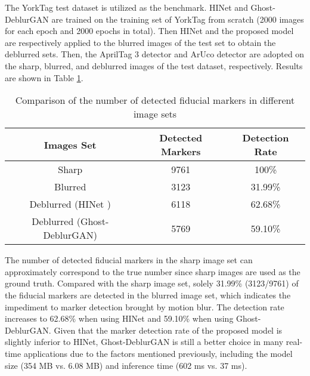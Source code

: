\documentclass[letterpaper, 10 pt, conference]{ieeeconf}
\begin{document}
The YorkTag test dataset is utilized as the benchmark. HINet and Ghost-DeblurGAN are trained on the training set of YorkTag from scratch (2000 images for each epoch and 2000 epochs in total). Then HINet and the proposed model are respectively applied to the blurred images of the test set to obtain the deblurred sets. Then, the AprilTag 3 detector \cite{ap3} and ArUco detector \cite{aruco} are adopted on the sharp, blurred, and deblurred images of the test dataset, respectively. Results are shown in Table \ref{tabdetection}.
\begin{table}[htb]
\caption{Comparison of the number of detected fiducial markers in different image sets}
\begin{center}
\begin{tabular}{c|c|c}
\hline\hline
Images Set & Detected Markers & Detection Rate \\ \hline
Sharp &9761 & 100\% \\ \hline
Blurred & 3123& 31.99\%\\ \hline
Deblurred (HINet \cite{chen2021hinet}) & 6118& 62.68\% \\ \hline
Deblurred (Ghost-DeblurGAN) & 5769& 59.10\% \\ \hline\hline
\end{tabular}
\label{tabdetection}
\end{center}
\end{table}

The number of detected fiducial markers in the sharp image set can approximately correspond to the true number since sharp images are used as the ground truth. Compared with the sharp image set, solely 31.99\% (3123/9761) of the fiducial markers are detected in the blurred image set, which indicates the impediment to marker detection brought by motion blur. The detection rate increases to 62.68\% when using HINet \cite{chen2021hinet} and 59.10\% when using Ghost-DeblurGAN. Given that the marker detection rate of the proposed model is slightly inferior to HINet, Ghost-DeblurGAN is still a better choice in many real-time applications due to the factors mentioned previously, including the model size (354 MB vs. 6.08 MB) and inference time (602 ms vs. 37 ms). 
\end{document}
